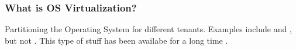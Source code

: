 \begin{frame}
\frametitle{What is OS Virtualization?}
	Partitioning the Operating System for different tenants. Examples include \cite{jails} and
	\cite{zones}, but not \cite{alto}. This type of stuff has been availabe for a long time
	\cite{vm370}.
\end{frame}
